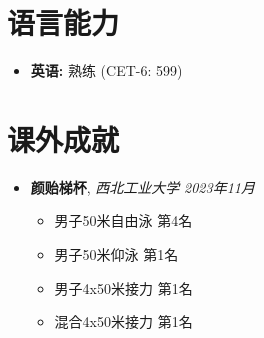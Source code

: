 \documentclass[a4paper,10pt]{article}
\begin{document}
\section*{语言能力}
\begin{itemize}[leftmargin=0.5cm]
	\item \textbf{英语:} 熟练 (CET-6: 599)
\end{itemize}

\section*{课外成就}
\begin{itemize}[leftmargin=0.5cm]
    \item \textbf{颜贻梯杯}, \textit{西北工业大学} \hfill \textit{2023年11月} 
    \begin{itemize}
        \item 男子50米自由泳 第4名
        \item 男子50米仰泳 第1名
        \item 男子4x50米接力 第1名
        \item 混合4x50米接力 第1名
    \end{itemize}
\end{itemize}
\end{document}
